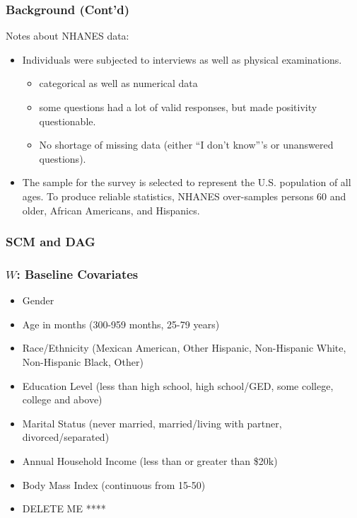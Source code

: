 \documentclass{beamer}
\begin{document}
\begin{frame}
  \frametitle{Background (Cont'd)}
  Notes about NHANES data:
  \begin{itemize}
 \item Individuals were subjected to interviews as well as physical examinations.
  \begin{itemize}
    \item categorical as well as numerical data
    \item some questions had a lot of valid responses, but made positivity questionable.
    \item No shortage of missing data (either ``I don't know'''s or unanswered questions).
  \end{itemize}
 \item The sample for the survey is selected to represent the U.S. population of all ages. To produce reliable statistics, NHANES over-samples persons 60 and older, African Americans, and Hispanics.
 \end{itemize}
\end{frame}

\begin{frame}
\frametitle{SCM and DAG}
\end{frame}

\begin{frame}
\frametitle{$W$: Baseline Covariates}
   \begin{itemize}
   \item Gender \\
   \item Age in months (300-959 months, 25-79 years) \\
   \item Race/Ethnicity (Mexican American, Other Hispanic, Non-Hispanic White, Non-Hispanic Black, Other) \\
   \item Education Level (less than high school, high school/GED, some college, college and above) \\
   \item Marital Status (never married, married/living with partner, divorced/separated) \\
   \item Annual Household Income (less than or greater than \$20k) \\
   \item Body Mass Index (continuous from 15-50) \\
   \item DELETE ME ****
  \end{itemize}

\end{frame}
\end{document}
